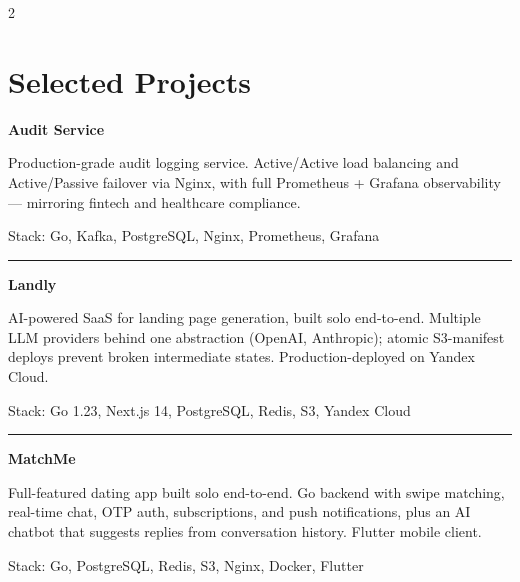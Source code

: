 \documentclass[10pt,a4paper]{article}
\begin{document}
\setlength{\columnsep}{0.8cm}
\begin{paracol}{2}

\section*{Selected Projects}
\fontsize{9}{10.5}\selectfont

\par\noindent
{\fontsize{12}{14}\bfseries\selectfont Audit Service}\par
Production-grade audit logging service. Active/Active load balancing and Active/Passive failover via Nginx, with full Prometheus + Grafana observability --- mirroring fintech and healthcare compliance.\par
{\fontsize{8}{10}\color{muted}\selectfont Stack: Go, Kafka, PostgreSQL, Nginx, Prometheus, Grafana}\par
\vspace{1pt}
{\color{hairline}\rule{\linewidth}{0.4pt}}
\vspace{1pt}

\par\noindent
{\fontsize{12}{14}\bfseries\selectfont Landly}\par
AI-powered SaaS for landing page generation, built solo end-to-end. Multiple LLM providers behind one abstraction (\mbox{OpenAI}, \mbox{Anthropic}); atomic S3-manifest deploys prevent broken intermediate states. Production-deployed on Yandex Cloud.\par
{\fontsize{8}{10}\color{muted}\selectfont Stack: Go 1.23, Next.js 14, PostgreSQL, Redis, S3, Yandex Cloud}\par
\vspace{1pt}
{\color{hairline}\rule{\linewidth}{0.4pt}}
\vspace{1pt}

\par\noindent
{\fontsize{12}{14}\bfseries\selectfont MatchMe}\par
Full-featured dating app built solo end-to-end. Go backend with swipe matching, real-time chat, OTP auth, subscriptions, and push notifications, plus an AI chatbot that suggests replies from conversation history. Flutter mobile client.\par
{\fontsize{8}{10}\color{muted}\selectfont Stack: Go, PostgreSQL, Redis, S3, Nginx, Docker, Flutter}


\end{paracol}
\end{document}
